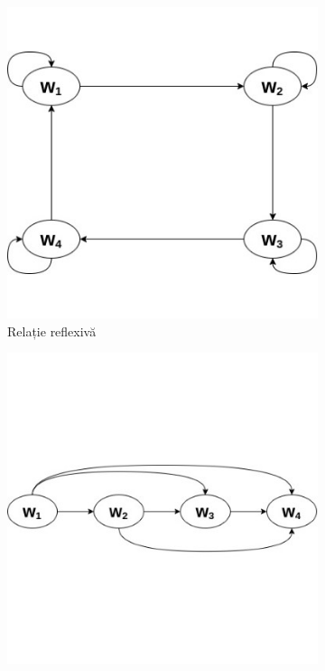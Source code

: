\documentclass[12pt, openany]{book}
\begin{document}
            \begin{figure}[h!]
                \label{fig_example_3}
                \centering
                \begin{subfigure}[h]{0.3\linewidth}
                    \label{fig_reflexivity}
                    \includegraphics[width=\linewidth]{images/reflexivity.jpg}
                    \caption{Relație reflexivă}
                \end{subfigure}
                \hfill
                \begin{subfigure}[h]{0.3\linewidth}
                    \label{fig_transitivity}
                    \includegraphics[width=\linewidth]{images/transitivity.jpg}

\end{subfigure}
\end{figure}
\end{document}
